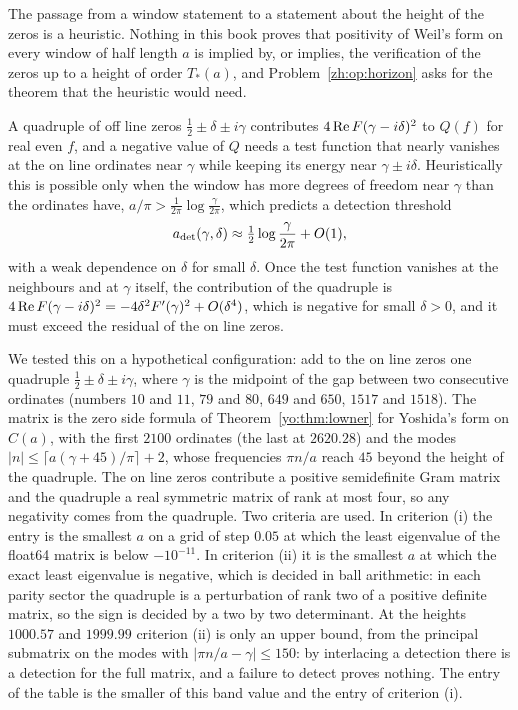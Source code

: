 The passage from a window statement to a statement about the height of the zeros is a heuristic. Nothing in this book proves that positivity of Weil's form on every window of half length $a$ is implied by, or implies, the verification of the zeros up to a height of order $T_*(a)$, and Problem~\ref{zh:op:horizon} asks for the theorem that the heuristic would need.

A quadruple of off line zeros $\frac12\pm\delta\pm i\gamma$ contributes $4\operatorname{Re} F(\gamma-i\delta)^2$ to $Q(f)$ for real even $f$, and a negative value of $Q$ needs a test function that nearly vanishes at the on line ordinates near $\gamma$ while keeping its energy near $\gamma\pm i\delta$. Heuristically this is possible only when the window has more degrees of freedom near $\gamma$ than the ordinates have, $a/\pi>\frac1{2\pi}\log\frac\gamma{2\pi}$, which predicts a detection threshold
\[
a_{\rm det}(\gamma,\delta)\approx\tfrac12\log\frac\gamma{2\pi}+O(1),
\]
with a weak dependence on $\delta$ for small $\delta$. Once the test function vanishes at the neighbours and at $\gamma$ itself, the contribution of the quadruple is $4\operatorname{Re} F(\gamma-i\delta)^2=-4\delta^2F'(\gamma)^2+O(\delta^4)$, which is negative for small $\delta>0$, and it must exceed the residual of the on line zeros.

We tested this on a hypothetical configuration: add to the on line zeros one quadruple $\frac12\pm\delta\pm i\gamma$, where $\gamma$ is the midpoint of the gap between two consecutive ordinates (numbers $10$ and $11$, $79$ and $80$, $649$ and $650$, $1517$ and $1518$). The matrix is the zero side formula of Theorem~\ref{yo:thm:lowner} for Yoshida's form on $C(a)$, with the first $2100$ ordinates (the last at $2620.28$) and the modes $|n|\le\lceil a(\gamma+45)/\pi\rceil+2$, whose frequencies $\pi n/a$ reach $45$ beyond the height of the quadruple. The on line zeros contribute a positive semidefinite Gram matrix and the quadruple a real symmetric matrix of rank at most four, so any negativity comes from the quadruple. Two criteria are used. In criterion (i) the entry is the smallest $a$ on a grid of step $0.05$ at which the least eigenvalue of the float64 matrix is below $-10^{-11}$. In criterion (ii) it is the smallest $a$ at which the exact least eigenvalue is negative, which is decided in ball arithmetic: in each parity sector the quadruple is a perturbation of rank two of a positive definite matrix, so the sign is decided by a two by two determinant. At the heights $1000.57$ and $1999.99$ criterion (ii) is only an upper bound, from the principal submatrix on the modes with $|\pi n/a-\gamma|\le150$: by interlacing a detection there is a detection for the full matrix, and a failure to detect proves nothing. The entry of the table is the smaller of this band value and the entry of criterion (i).

